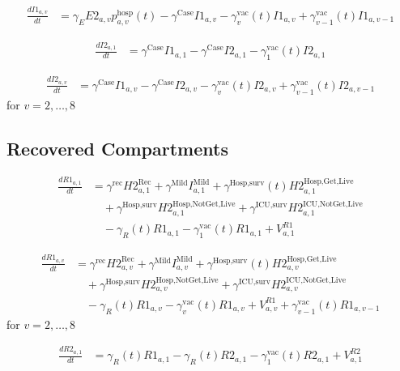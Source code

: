 \documentclass[12pt]{article}
\begin{document}
\begin{align*}
\frac{dI1_{a,v}}{dt} &= \gamma_E E2_{a,v} p^{\text{hosp}}_{a,v}(t) - \gamma^{\text{Case}} I1_{a,v} - \gamma^{\text{vac}}_v(t) I1_{a,v} + \gamma^{\text{vac}}_{v-1}(t) I1_{a,v-1}
\end{align*}

\begin{align*}
\frac{dI2_{a,1}}{dt} &= \gamma^{\text{Case}} I1_{a,1} - \gamma^{\text{Case}} I2_{a,1} - \gamma^{\text{vac}}_1(t) I2_{a,1}
\end{align*}

\begin{align*}
\frac{dI2_{a,v}}{dt} &= \gamma^{\text{Case}} I1_{a,v} - \gamma^{\text{Case}} I2_{a,v} - \gamma^{\text{vac}}_v(t) I2_{a,v} + \gamma^{\text{vac}}_{v-1}(t) I2_{a,v-1}
\end{align*}
for $v = 2, \ldots, 8$

\subsection{Recovered Compartments}

\begin{align*}
\frac{dR1_{a,1}}{dt} &= \gamma^{\text{rec}} H2^{\text{Rec}}_{a,1} + \gamma^{\text{Mild}} I^{\text{Mild}}_{a,1} + \gamma^{\text{Hosp,surv}}(t) H2^{\text{Hosp,Get,Live}}_{a,1} \\
&\quad + \gamma^{\text{Hosp,surv}} H2^{\text{Hosp,NotGet,Live}}_{a,1} + \gamma^{\text{ICU,surv}} H2^{\text{ICU,NotGet,Live}}_{a,1} \\
&\quad - \gamma_R(t) R1_{a,1} - \gamma^{\text{vac}}_1(t) R1_{a,1} + V^{R1}_{a,1}
\end{align*}

\begin{align*}
\frac{dR1_{a,v}}{dt} &= \gamma^{\text{rec}} H2^{\text{Rec}}_{a,v} + \gamma^{\text{Mild}} I^{\text{Mild}}_{a,v} + \gamma^{\text{Hosp,surv}}(t) H2^{\text{Hosp,Get,Live}}_{a,v} \\
&\quad + \gamma^{\text{Hosp,surv}} H2^{\text{Hosp,NotGet,Live}}_{a,v} + \gamma^{\text{ICU,surv}} H2^{\text{ICU,NotGet,Live}}_{a,v} \\
&\quad - \gamma_R(t) R1_{a,v} - \gamma^{\text{vac}}_v(t) R1_{a,v} + V^{R1}_{a,v} + \gamma^{\text{vac}}_{v-1}(t) R1_{a,v-1}
\end{align*}
for $v = 2, \ldots, 8$

\begin{align*}
\frac{dR2_{a,1}}{dt} &= \gamma_R(t) R1_{a,1} - \gamma_R(t) R2_{a,1} - \gamma^{\text{vac}}_1(t) R2_{a,1} + V^{R2}_{a,1}
\end{align*}
\end{document}
